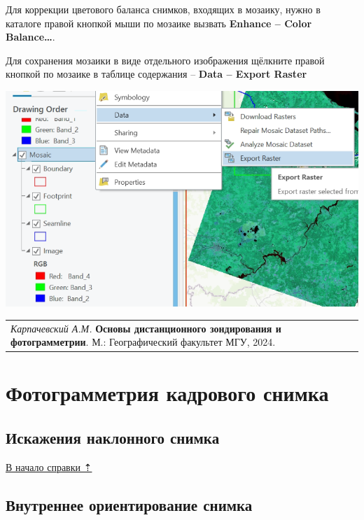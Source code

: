 \documentclass[
  12pt,
]{book}
\begin{document}
Для коррекции цветового баланса снимков, входящих в мозаику, нужно в каталоге правой кнопкой мыши по мозаике вызвать \textbf{Enhance -- Color Balance\ldots{}}.

Для сохранения мозаики в виде отдельного изображения щёлкните правой кнопкой по мозаике в таблице содержания -- \textbf{Data -- Export Raster}

\includegraphics{images/Ref03/Export_Mosaic.png}

\begin{longtable}[]{@{}l@{}}
\toprule\noalign{}
\endhead
\bottomrule\noalign{}
\endlastfoot
\emph{Карпачевский А.М.} \textbf{Основы дистанционного зондирования и фотограмметрии}. М.: Географический факультет МГУ, 2024. \\
\end{longtable}

\hypertarget{photogrammetry}{%
\chapter{Фотограмметрия кадрового снимка}\label{photogrammetry}}

\hypertarget{photogrammetry-oblique}{%
\section{Искажения наклонного снимка}\label{photogrammetry-oblique}}

\protect\hyperlink{photogrammetry}{В начало справки ⇡}

\hypertarget{photogrammetry-interior}{%
\section{Внутреннее ориентирование снимка}\label{photogrammetry-interior}}
\end{document}
